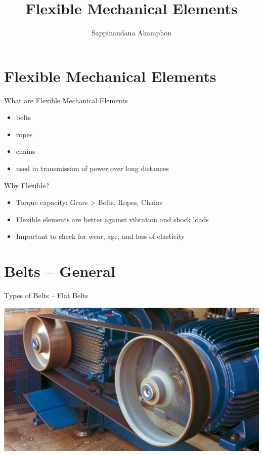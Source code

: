 \documentclass[10pt, svgnames]{beamer}
\author{Sappinandana Akamphon}
\date{}
\title{Flexible Mechanical Elements}
\institute{Department of Mechanical Engineering, TSE}
\begin{document}
\maketitle

\section{Flexible Mechanical Elements}
\label{sec:orge42984a}

\begin{frame}[label={sec:org9b503d1}]{What are Flexible Mechanical Elements}
\begin{itemize}
\item belts
\item ropes
\item chains

\item used in transmission of power over long distances
\end{itemize}
\end{frame}

\begin{frame}[label={sec:orga37703e}]{Why Flexible?}
\begin{itemize}
\item Torque capacity: Gears > Belts, Ropes, Chains
\item Flexible elements are better against vibration and shock loads
\item Important to check for wear, age, and loss of elasticity
\end{itemize}
\end{frame}

\section{Belts -- General}
\label{sec:orgfb97aa9}

\begin{frame}[label={sec:orgc2e12ed}]{Types of Belts -- Flat Belts}
\begin{center}
\includegraphics[width=.9\linewidth]{./pictures/flat-belt.png}
\end{center}
\end{frame}
\end{document}
